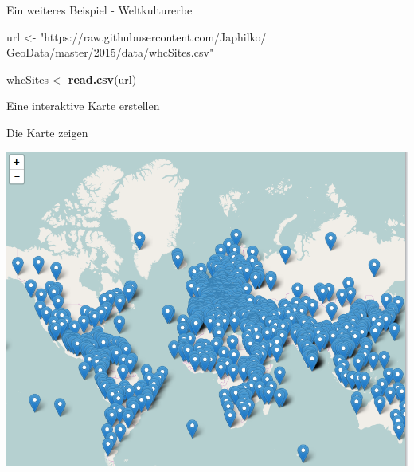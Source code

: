 \documentclass[ignorenonframetext,]{beamer}
\newenvironment{Shaded}{\begin{snugshade}}{\end{snugshade}}
\newcommand{\KeywordTok}[1]{\textcolor[rgb]{0.13,0.29,0.53}{\textbf{#1}}}
\newcommand{\DataTypeTok}[1]{\textcolor[rgb]{0.13,0.29,0.53}{#1}}
\newcommand{\StringTok}[1]{\textcolor[rgb]{0.31,0.60,0.02}{#1}}
\newcommand{\CommentTok}[1]{\textcolor[rgb]{0.56,0.35,0.01}{\textit{#1}}}
\newcommand{\OperatorTok}[1]{\textcolor[rgb]{0.81,0.36,0.00}{\textbf{#1}}}
\newcommand{\NormalTok}[1]{#1}
\begin{document}
\begin{frame}[fragile]{Ein weiteres Beispiel - Weltkulturerbe}

\begin{Shaded}
\begin{Highlighting}[]
\NormalTok{url <-}\StringTok{ "https://raw.githubusercontent.com/Japhilko/}
\StringTok{GeoData/master/2015/data/whcSites.csv"}

\NormalTok{whcSites <-}\StringTok{ }\KeywordTok{read.csv}\NormalTok{(url) }
\end{Highlighting}
\end{Shaded}

\end{frame}

\begin{frame}[fragile]{Eine interaktive Karte erstellen}

\begin{Shaded}
\end{Shaded}

\end{frame}

\begin{frame}{Die Karte zeigen}

\includegraphics{figure/WHCPopUps.PNG}

\end{frame}
\end{document}
